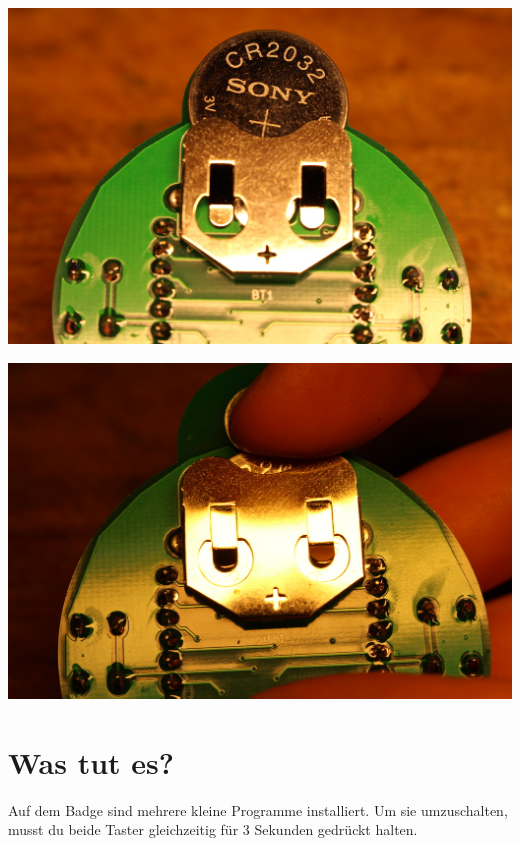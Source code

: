 \documentclass{article}
\begin{document}
\begin{minipage}[b]{0.5\textwidth}
	\includegraphics[width=\textwidth]{Bilder2021/IMG_8173.JPG}
\end{minipage}
\begin{minipage}[b]{0.5\textwidth}
	\includegraphics[width=\textwidth]{Bilder2021/IMG_8174.JPG}
\end{minipage}

\vspace{0.5cm}


\section{Was tut es?}

Auf dem Badge sind mehrere kleine Programme installiert. Um sie umzuschalten, musst du beide Taster gleichzeitig für 3 Sekunden gedrückt halten.\\
\end{document}
